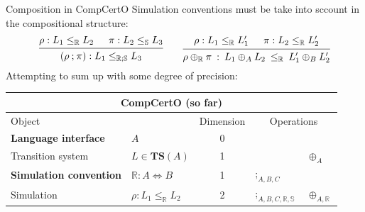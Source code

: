 \documentclass[aspectratio=1610,12pt]{beamer}
\begin{document}
\begin{frame}{Composition in CompCertO} %
  Simulation conventions must be take into sccount in the compositional structure:
  \[
    \begin{prooftree}
      \hypo{\rho : L_1 \le_\mathbb{R} L_2}
      \hypo{\pi : L_2 \le_\mathbb{S} L_3}
      \infer2{(\rho \mathbin; \pi) : L_1 \le_\mathbb{R \mathbin; S} L_3}
    \end{prooftree}
    \qquad
    \begin{prooftree}
      \hypo{\rho : L_1 \le_\mathbb{R} L_1'}
      \hypo{\pi : L_2 \le_\mathbb{R} L_2'}
      \infer2{\rho \oplus_\mathbb{R} \pi \: : \: L_1 \oplus_A L_2 \: \le_\mathbb{R} \: L_1' \oplus_B L_2'}
    \end{prooftree}
  \]
  \vfill
  Attempting to sum up with some degree of precision:
  \begin{center}
    \begin{tabular}{llcll}
      \toprule
      \multicolumn{5}{c}{\textbf{CompCertO} (so far)} \\
      \midrule
      Object & & Dimension & \multicolumn{2}{c}{Operations} \\
      \midrule
      \textbf{Language interface} & $A$ & 0 & \\
      Transition system & $L \in \mathbf{TS}(A)$ & 1 & & $\oplus_A$ \\
      \textbf{Simulation convention} & $\mathbb{R} : A \Leftrightarrow B$ & 1 & $\mathbin;_{A,B,C}$ \\
      Simulation & $\rho : L_1 \le_\mathbb{R} L_2$ & 2 & $\mathbin;_{A,B,C,\mathbb{R,S}}$ & $\oplus_{A,\mathbb{R}}$ \\
      \bottomrule
    \end{tabular}
  \end{center}
\end{frame}
\end{document}
